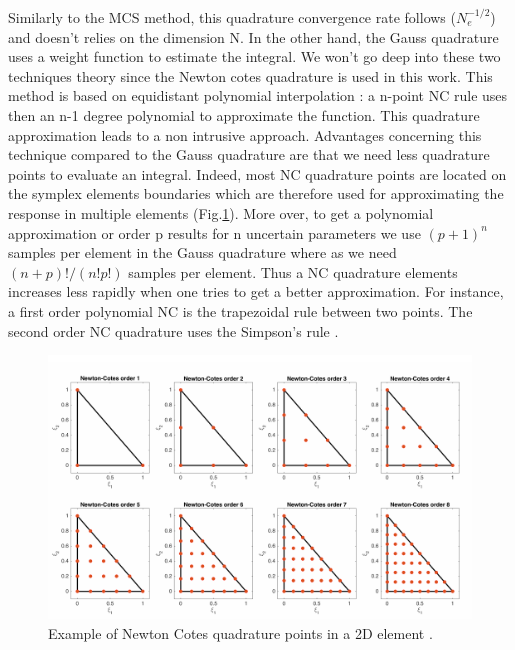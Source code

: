 \documentclass[11pt, a4paper, English]{report}
\begin{document}
Similarly to the MCS method, this quadrature convergence rate follows ($N_e^{-1/2}$) and doesn't relies on the dimension N. In the other hand, the Gauss quadrature uses a weight function to estimate the integral. We won't go deep into these two techniques theory since the Newton cotes quadrature is used in this work. This method is based on equidistant polynomial interpolation : a n-point NC rule uses then an n-1 degree polynomial to approximate the function. This quadrature approximation leads to a non intrusive approach. Advantages concerning this technique compared to the Gauss quadrature are that we need less quadrature points to evaluate an integral. Indeed, most NC quadrature points are located on the symplex elements boundaries which are therefore used for approximating the response in multiple elements (Fig.\ref{newtoncotes}). More over, to get a polynomial approximation or order p results for n uncertain parameters we use $(p + 1)^n$ samples per element in the Gauss quadrature where as we need $(n+p)!/(n!p!)$ samples per element. Thus a NC quadrature elements increases less rapidly when one tries to get a better approximation. For instance, a first order polynomial NC is the trapezoidal rule between two points. The second order NC quadrature uses the Simpson's rule \cite{NCquadrature}. 
\begin{figure}[h!]
    \centering
    \includegraphics[width=\textwidth]{NC.PNG}
    \caption{Example of Newton Cotes quadrature points in a 2D element \cite{Janthesis}.}
    \label{newtoncotes}
\end{figure}
\\\\
\end{document}
